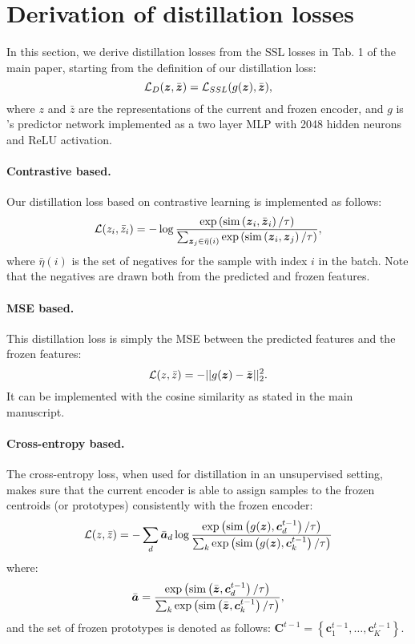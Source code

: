\section{Derivation of distillation losses}
In this section, we derive distillation losses from the SSL losses in Tab. 1 of the main paper, starting from the definition of our distillation loss:
\begin{equation}
    \mathcal{L}_D(\boldsymbol{z}, \bar{\boldsymbol{z}}) = \mathcal{L}_{SSL} (g(\boldsymbol{z}), \bar{\boldsymbol{z}}),
\end{equation}
where $z$ and $\bar{z}$ are the representations of the current and frozen encoder, and $g$ is \name{}'s predictor network implemented as a two layer MLP with 2048 hidden neurons and ReLU activation.
\paragraph{Contrastive based.} Our distillation loss based on contrastive learning is implemented as follows:
\begin{equation}
    \mathcal{L}(z_i, \bar{z}_i) = -\log \frac{\exp \left(\operatorname{sim}\left(\boldsymbol{z}_i, \bar{\boldsymbol{z}}_i\right) / \tau\right)}{\sum_{\boldsymbol{z}_j \in \bar{\eta}(i)} \exp \left(\operatorname{sim}\left(\boldsymbol{z}_i, \boldsymbol{z}_{j}\right) / \tau\right)},
\end{equation}
where $\bar{\eta}(i)$ is the set of negatives for the sample with index $i$ in the batch. Note that the negatives are drawn both from the predicted and frozen features.
\paragraph{MSE based.} This distillation loss is simply the MSE between the predicted features and the frozen features:
\begin{equation}
    \mathcal{L}(z, \bar{z}) = -||g(\boldsymbol{z}) -  \bar{\boldsymbol{z}}||^2_2 .
\end{equation}
It can be implemented with the cosine similarity as stated in the main manuscript.
\paragraph{Cross-entropy based.} The cross-entropy loss, when used for distillation in an unsupervised setting, makes sure that the current encoder is able to assign samples to the frozen centroids (or prototypes) consistently with the frozen encoder:
\begin{equation}
    \mathcal{L}(z, \bar{z}) = -\sum_{d} \bar{\boldsymbol{a}}_{d} \log \frac{\exp \left(\operatorname{sim}\left( g(\boldsymbol{z}), \boldsymbol{c}^{t-1}_{d}\right) / \tau\right)}{\sum_k \exp \left(\operatorname{sim}\left(g(\boldsymbol{z}), \boldsymbol{c}^{t-1}_k\right) / \tau\right)} 
\end{equation}
where:
\begin{equation}
    \bar{\boldsymbol{a}}= \frac{\exp \left(\operatorname{sim}\left( \bar{\boldsymbol{z}}, \boldsymbol{c}^{t-1}_{d}\right) / \tau\right)}{\sum_k \exp \left(\operatorname{sim}\left(\bar{\boldsymbol{z}}, \boldsymbol{c}^{t-1}_k\right) / \tau\right)},
\end{equation}
and the set of frozen prototypes is denoted as follows: $\mathbf{C}^{t-1} = \left\{\mathbf{c}^{t-1}_{1}, \ldots, \mathbf{c}^{t-1}_{K}\right\}$.
 
